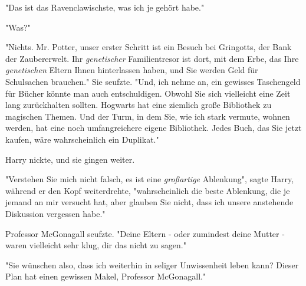 "Das ist das Ravenclawischste, was ich je gehört habe."

"Was?" 

"Nichts. Mr. Potter, unser erster Schritt ist ein Besuch bei Gringotts, der Bank der Zaubererwelt. Ihr \emph{genetischer} Familientresor ist dort, mit dem Erbe, das Ihre \emph{genetischen} Eltern Ihnen hinterlassen haben, und Sie werden Geld für Schulsachen brauchen." Sie seufzte. "Und, ich nehme an, ein gewisses Taschengeld für Bücher könnte man auch entschuldigen. Obwohl Sie sich vielleicht eine Zeit lang zurückhalten sollten. Hogwarts hat eine ziemlich große Bibliothek zu magischen Themen. Und der Turm, in dem Sie, wie ich stark vermute, wohnen werden, hat eine noch umfangreichere eigene Bibliothek. Jedes Buch, das Sie jetzt kaufen, wäre wahrscheinlich ein Duplikat." 

Harry nickte, und sie gingen weiter. 

"Verstehen Sie mich nicht falsch, es ist eine \emph{großartige} Ablenkung", sagte Harry, während er den Kopf weiterdrehte, "wahrscheinlich die beste Ablenkung, die je jemand an mir versucht hat, aber glauben Sie nicht, dass ich unsere anstehende Diskussion vergessen habe." 

Professor McGonagall seufzte. "Deine Eltern - oder zumindest deine Mutter - waren vielleicht sehr klug, dir das nicht zu sagen." 

"Sie wünschen also, dass ich weiterhin in seliger Unwissenheit leben kann? Dieser Plan hat einen gewissen Makel, Professor McGonagall." 

